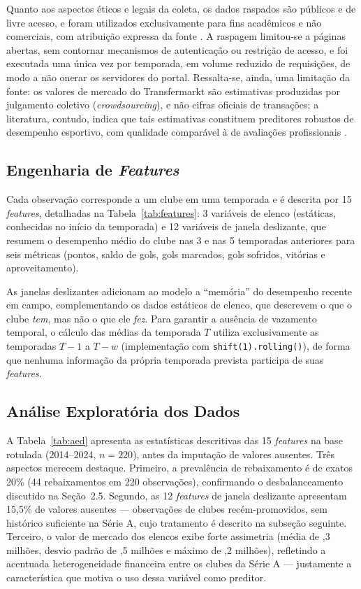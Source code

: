 \documentclass[
    article,
    12pt,
    oneside,
    a4paper,
    english,
    brazilian
    ]{abntex2}
\providecommand{\euro}{\texteuro}
\begin{document}
Quanto aos aspectos éticos e legais da coleta, os dados raspados são públicos e de livre acesso, e foram utilizados exclusivamente para fins acadêmicos e não comerciais, com atribuição expressa da fonte \cite{transfermarkt2025}. A raspagem limitou-se a páginas abertas, sem contornar mecanismos de autenticação ou restrição de acesso, e foi executada uma única vez por temporada, em volume reduzido de requisições, de modo a não onerar os servidores do portal. Ressalta-se, ainda, uma limitação da fonte: os valores de mercado do Transfermarkt são estimativas produzidas por julgamento coletivo (\textit{crowdsourcing}), e não cifras oficiais de transações; a literatura, contudo, indica que tais estimativas constituem preditores robustos de desempenho esportivo, com qualidade comparável à de avaliações profissionais \cite{muller2017}.

\subsection{Engenharia de \textit{Features}}

Cada observação corresponde a um clube em uma temporada e é descrita por 15 \textit{features}, detalhadas na Tabela~\ref{tab:features}: 3 variáveis de elenco (estáticas, conhecidas no início da temporada) e 12 variáveis de janela deslizante, que resumem o desempenho médio do clube nas 3 e nas 5 temporadas anteriores para seis métricas (pontos, saldo de gols, gols marcados, gols sofridos, vitórias e aproveitamento).



As janelas deslizantes adicionam ao modelo a ``memória'' do desempenho recente em campo, complementando os dados estáticos de elenco, que descrevem o que o clube \emph{tem}, mas não o que ele \emph{fez}. Para garantir a ausência de vazamento temporal, o cálculo das médias da temporada $T$ utiliza exclusivamente as temporadas $T-1$ a $T-w$ (implementação com \texttt{shift(1).rolling()}), de forma que nenhuma informação da própria temporada prevista participa de suas \textit{features}.

\subsection{Análise Exploratória dos Dados}

A Tabela~\ref{tab:aed} apresenta as estatísticas descritivas das 15 \textit{features} na base rotulada (2014--2024, $n = 220$), antes da imputação de valores ausentes. Três aspectos merecem destaque. Primeiro, a prevalência de rebaixamento é de exatos 20\% (44 rebaixamentos em 220 observações), confirmando o desbalanceamento discutido na Seção~2.5. Segundo, as 12 \textit{features} de janela deslizante apresentam 15,5\% de valores ausentes --- observações de clubes recém-promovidos, sem histórico suficiente na Série A, cujo tratamento é descrito na subseção seguinte. Terceiro, o valor de mercado dos elencos exibe forte assimetria (média de \euro 55,3 milhões, desvio padrão de \euro 38,5 milhões e máximo de \euro 214,2 milhões), refletindo a acentuada heterogeneidade financeira entre os clubes da Série A --- justamente a característica que motiva o uso dessa variável como preditor.
\end{document}
